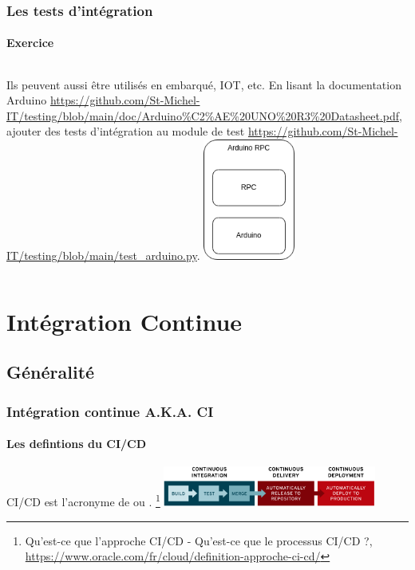 \documentclass{beamer}
\begin{document}
    \begin{frame}
        \transdissolve
        \frametitle{Les tests d'intégration}
        \framesubtitle{Exercice \execcounterdispinc{}}
        \begin{columns}
            Ils peuvent aussi être utilisés en embarqué, IOT, etc.
            \bigbreak
            En lisant la documentation Arduino  \url{https://github.com/St-Michel-IT/testing/blob/main/doc/Arduino\%C2\%AE\%20UNO\%20R3\%20Datasheet.pdf}, ajouter des tests d'intégration au module de test \url{https://github.com/St-Michel-IT/testing/blob/main/test_arduino.py}.
            \centering
            \includegraphics[width=3cm]{image/arduino-rpc-stack.drawio}
        \end{columns}
    \end{frame}


    \section{Intégration Continue}\label{sec:ci}

    \subsection{Généralité}\label{subsec:ci-general}
    \begin{frame}
        \frametitle{Intégration continue A.K.A. CI}
        \framesubtitle{Les defintions du CI/CD}
        \transdissolve
        CI/CD est l'acronyme de  ou .
        \bigbreak
        \footnote{Qu'est-ce que l'approche CI/CD - Qu’est-ce que le processus CI/CD ?, \url{https://www.oracle.com/fr/cloud/definition-approche-ci-cd/}}
        \bigbreak
        \centering
        \includegraphics[width=7cm]{image/ci-cd-flow}
    \end{frame}
\end{document}
